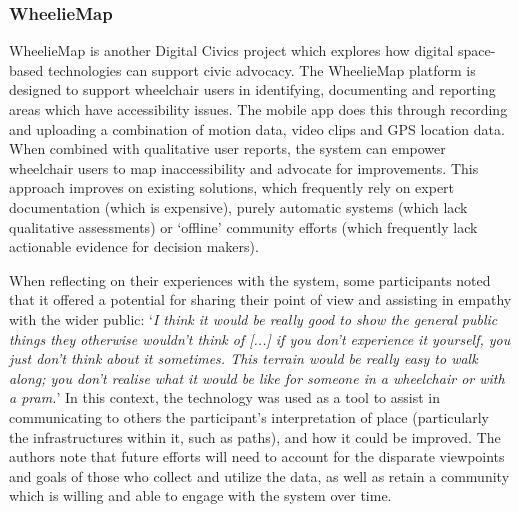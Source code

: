 \subsubsection{WheelieMap}

WheelieMap \citep{Kirkham2017} is another Digital Civics project which explores how digital space-based technologies can support civic advocacy. The WheelieMap platform is designed to support wheelchair users in identifying, documenting and reporting areas which have accessibility issues. The mobile app does this through recording and uploading a combination of motion data, video clips and GPS location data. When combined with qualitative user reports, the system can empower wheelchair users to map inaccessibility and advocate for improvements. This approach improves on existing solutions, which frequently rely on expert documentation (which is expensive), purely automatic systems (which lack qualitative assessments) or `offline' community efforts (which frequently lack actionable evidence for decision makers). 

When reflecting on their experiences with the system, some participants noted that it offered a potential for sharing their point of view and assisting in empathy with the wider public: `\textit{I think it would be really good to show the general public things they otherwise wouldn't think of [...] if you don't experience it yourself, you just don't think about it sometimes. This terrain would be really easy to walk along; you don't realise what it would be like for someone in a wheelchair or with a pram.}' In this context, the technology was used as a tool to assist in communicating to others the participant's interpretation of place (particularly the infrastructures within it, such as paths), and how it could be improved. The authors note that future efforts will need to account for the disparate viewpoints and goals of those who collect and utilize the data, as well as retain a community which is willing and able to engage with the system over time.

